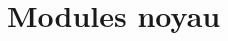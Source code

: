 %
%

\part{Modules noyau}

\begin{frame}
  \partpage
\end{frame}

\begin{frame}
  \tableofcontents
\end{frame}


